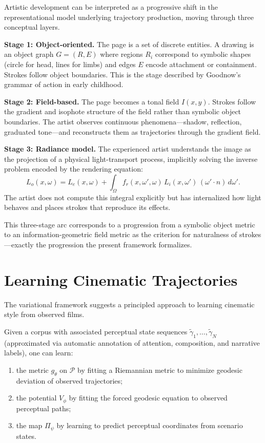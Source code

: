 \documentclass[12pt,a4paper]{article}
\theoremstyle{plain}
\theoremstyle{definition}
\begin{document}
Artistic development can be interpreted as a progressive shift in the
representational model underlying trajectory production, moving through three
conceptual layers.

\textbf{Stage 1: Object-oriented.} The page is a set of discrete entities.
A drawing is an object graph $G=(R,E)$ where regions $R_i$ correspond to
symbolic shapes (circle for head, lines for limbs) and edges $E$ encode
attachment or containment. Strokes follow object boundaries. This is the
stage described by Goodnow's grammar of action in early childhood.

\textbf{Stage 2: Field-based.} The page becomes a tonal field $I(x,y)$. Strokes
follow the gradient and isophote structure of the field rather than symbolic
object boundaries. The artist observes continuous phenomena---shadow, reflection,
graduated tone---and reconstructs them as trajectories through the gradient
field.

\textbf{Stage 3: Radiance model.} The experienced artist understands the image
as the projection of a physical light-transport process, implicitly solving the
inverse problem encoded by the rendering equation:
\[
L_o(x,\omega) = L_e(x,\omega)
+ \int_\Omega f_r(x,\omega',\omega)\,L_i(x,\omega')\,(\omega'\cdot n)\,d\omega'.
\]
The artist does not compute this integral explicitly but has internalized how
light behaves and places strokes that reproduce its effects.

This three-stage arc corresponds to a progression from a symbolic object metric
to an information-geometric field metric as the criterion for naturalness of
strokes---exactly the progression the present framework formalizes.

\section{Learning Cinematic Trajectories}
\label{sec:learning}

The variational framework suggests a principled approach to learning cinematic
style from observed films.

Given a corpus with associated perceptual state sequences
$\tilde\gamma_1,\dots,\tilde\gamma_N$ (approximated via automatic annotation
of attention, composition, and narrative labels), one can learn:
\begin{enumerate}[label=(\alph*)]
\item the metric $g_\theta$ on $\mathcal{P}$ by fitting a Riemannian metric
  to minimize geodesic deviation of observed trajectories;
\item the potential $V_\phi$ by fitting the forced geodesic equation to
  observed perceptual paths;
\item the map $\Pi_\psi$ by learning to predict perceptual coordinates from
  scenario states.
\end{enumerate}
\end{document}
